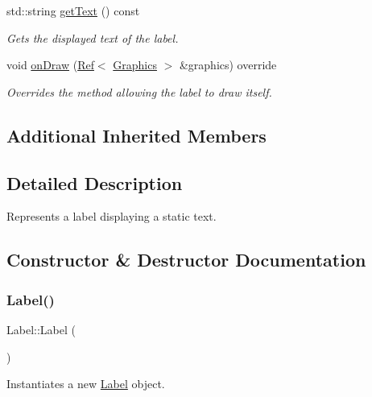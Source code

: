 \begin{DoxyCompactItemize}
std\+::string \mbox{\hyperlink{class_label_a5306a233501af781095f08e95ebcfb23}{get\+Text}} () const
\begin{DoxyCompactList}\small\item\em Gets the displayed text of the label. \end{DoxyCompactList}\item 
void \mbox{\hyperlink{class_label_ac418a8328a971f5da7f46c9c6e9fd7e5}{on\+Draw}} (\mbox{\hyperlink{class_ref}{Ref}}$<$ \mbox{\hyperlink{class_graphics}{Graphics}} $>$ \&graphics) override
\begin{DoxyCompactList}\small\item\em Overrides the method allowing the label to draw itself. \end{DoxyCompactList}\end{DoxyCompactItemize}
\subsection*{Additional Inherited Members}


\subsection{Detailed Description}
Represents a label displaying a static text. 



\subsection{Constructor \& Destructor Documentation}
\mbox{\label{class_label_af8f2bccf9faadcb2ca964bd2347dde24}} 
\subsubsection{\texorpdfstring{Label()}{Label()}}
{\footnotesize\ttfamily Label\+::\+Label (\begin{DoxyParamCaption}{ }\end{DoxyParamCaption})}



Instantiates a new \mbox{\hyperlink{class_label}{Label}} object. 

\mbox{\label{class_label_a21f4dd9aa297a03f641dd689ea291e2b}} 
